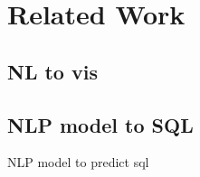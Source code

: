 \section{Related Work}

\subsection{NL to vis }




\subsection{NLP model to SQL}

NLP model to predict sql 
